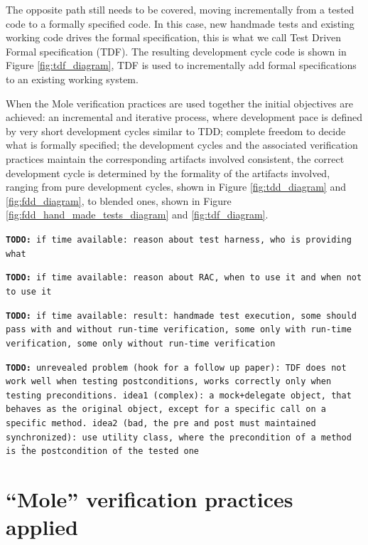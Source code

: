 \documentclass[english]{lni}
\newcommand{\todo}[1]{\texttt{\textbf{TODO:} #1}}
\begin{document}
The opposite path still needs to be covered, moving incrementally from a tested code to a formally specified code.
In this case, new handmade tests and existing working code drives the formal specification, this is what we call Test Driven Formal specification (TDF).
The resulting development cycle code is shown in Figure \ref{fig:tdf_diagram}, TDF is used to incrementally add formal specifications to an existing working system.

When the Mole verification practices are used together the initial objectives are achieved: an incremental and iterative process, where development pace is defined by very short development cycles similar to TDD; complete freedom to decide what is formally specified; the development cycles and the associated verification practices maintain the corresponding artifacts involved consistent, the correct development cycle is determined by the formality of the artifacts involved, ranging from pure development cycles, shown in Figure \ref{fig:tdd_diagram} and \ref{fig:fdd_diagram}, to blended ones, shown in Figure \ref{fig:fdd_hand_made_tests_diagram} and \ref{fig:tdf_diagram}.

\todo{if time available: reason about test harness, who is providing what}

\todo{if time available: reason about RAC, when to use it and when not to use it}

\todo{if time available: result: handmade test execution, some should pass with and without run-time verification, some only with run-time verification, some only without run-time verification}

\todo{unrevealed problem (hook for a follow up paper): TDF does not work well when testing postconditions, works correctly only when testing preconditions. idea1 (complex): a mock+delegate object, that behaves as the original object, except for a specific call on a specific method. idea2 (bad, the pre and post must maintained synchronized): use utility class, where the precondition of a method is \~ the postcondition of the tested one}



\section{``Mole'' verification practices applied}
\label{sec:a_complex_case_study}
\end{document}
